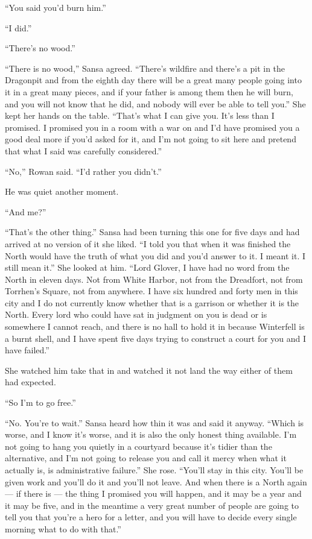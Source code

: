 “You said you’d burn him.”

“I did.”

“There’s no wood.”

“There is no wood,” Sansa agreed. “There’s wildfire and there’s a pit in the Dragonpit and from the eighth day there will be a great many people going into it in a great many pieces, and if your father is among them then he will burn, and you will not know that he did, and nobody will ever be able to tell you.” She kept her hands on the table. “That’s what I can give you. It’s less than I promised. I promised you in a room with a war on and I’d have promised you a good deal more if you’d asked for it, and I’m not going to sit here and pretend that what I said was carefully considered.”

“No,” Rowan said. “I’d rather you didn’t.”

He was quiet another moment.

“And me?”

“That’s the other thing.” Sansa had been turning this one for five days and had arrived at no version of it she liked. “I told you that when it was finished the North would have the truth of what you did and you’d answer to it. I meant it. I still mean it.” She looked at him. “Lord Glover, I have had no word from the North in eleven days. Not from White Harbor, not from the Dreadfort, not from Torrhen’s Square, not from anywhere. I have six hundred and forty men in this city and I do not currently know whether that is a garrison or whether it is the North. Every lord who could have sat in judgment on you is dead or is somewhere I cannot reach, and there is no hall to hold it in because Winterfell is a burnt shell, and I have spent five days trying to construct a court for you and I have failed.”

She watched him take that in and watched it not land the way either of them had expected.

“So I’m to go free.”

“No. You’re to wait.” Sansa heard how thin it was and said it anyway. “Which is worse, and I know it’s worse, and it is also the only honest thing available. I’m not going to hang you quietly in a courtyard because it’s tidier than the alternative, and I’m not going to release you and call it mercy when what it actually is, is administrative failure.” She rose. “You’ll stay in this city. You’ll be given work and you’ll do it and you’ll not leave. And when there is a North again — if there is — the thing I promised you will happen, and it may be a year and it may be five, and in the meantime a very great number of people are going to tell you that you’re a hero for a letter, and you will have to decide every single morning what to do with that.”

